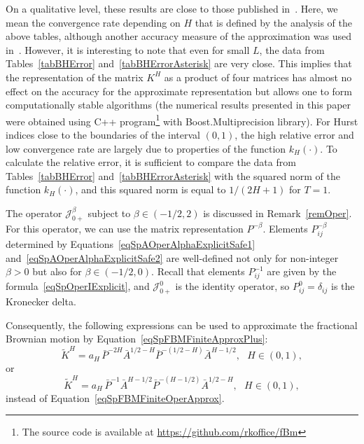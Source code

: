 \documentclass[10pt,reqno]{amsart}
\theoremstyle{plain}
\theoremstyle{remark}
\newcommand{\cj}{\mathcal{J}}
\begin{document}
On a qualitative level, these results are close to those published in~\cite{Ryb_Comp25}. Here, we mean the convergence rate depending on $H$ that is defined by the analysis of the above tables, although another accuracy measure of the approximation was used in~\cite{Ryb_Comp25}. However, it is interesting to note that even for small $L$, the data from Tables~\ref{tabBHError} and~\ref{tabBHErrorAsterisk} are very close. This implies that the representation of the matrix $K^H$ as a product of four matrices has almost no effect on the accuracy for the approximate representation but allows one to form computationally stable algorithms (the numerical results presented in this paper were obtained using C++ program\footnote{The source code is available at \url{https://github.com/rkoffice/fBm}} with Boost.Multiprecision library). For Hurst indices close to the boundaries of the interval $(0,1)$, the high relative error and low convergence rate are largely due to properties of the function $k_H(\cdot)$. To calculate the relative error, it is sufficient to compare the data from Tables~\ref{tabBHError} and~\ref{tabBHErrorAsterisk} with the squared norm of the function $k_H(\cdot)$, and this squared norm is equal to $1/(2H+1)$ for $T = 1$.

The operator $\cj_{0+}^\beta$ subject to $\beta \in (-1/2,2)$ is discussed in Remark~\ref{remOper}. For this operator, we can use the matrix representation $P^{-\beta}$. Elements $P_{ij}^{-\beta}$ determined by Equations~\eqref{eqSpAOperAlphaExplicitSafe1} and~\eqref{eqSpAOperAlphaExplicitSafe2} are well-defined not only for non-integer $\beta > 0$ but also for $\beta \in (-1/2,0)$. Recall that elements $P_{ij}^{-1}$ are given by the formula~\eqref{eqSpOperIExplicit}, and $\cj_{0+}^0$ is the identity operator, so $P_{ij}^0 = \delta_{ij}$ is the Kronecker delta.

Consequently, the following expressions can be used to approximate the fractional Brownian motion by Equation~\eqref{eqSpFBMFiniteApproxPlus}:
\begin{equation}\label{eqSpFBMFiniteOperApproxA}
  \tilde K^H = a_H \, \bar P^{-2H} \bar A^{1/2-H} \bar P^{-(1/2-H)} \bar A^{H-1/2}, \ \ \ H \in (0,1),
\end{equation}
or
\begin{equation}\label{eqSpFBMFiniteOperApproxB}
  \tilde K^H = a_H \, \bar P^{-1} \bar A^{H-1/2} \bar P^{-(H-1/2)} \bar A^{1/2-H}, \ \ \ H \in (0,1),
\end{equation}
instead of Equation~\eqref{eqSpFBMFiniteOperApprox}.
\end{document}
